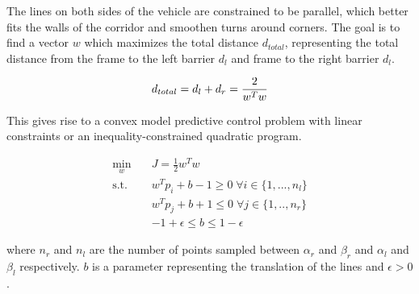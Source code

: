 \documentclass[conference]{IEEEtran}
\begin{document}
The lines on both sides of the vehicle are constrained to be parallel, which better fits the walls of the corridor and smoothen turns around corners. The goal is to find a vector $w$ which maximizes the total distance $d_{total}$, representing the total distance from the frame to the left barrier $d_l$ and frame to the right barrier $d_l$. 

\begin{align}
    d_{total} = d_l + d_r = \frac{2}{w^T w} \notag
\end{align}


This gives rise to a convex model predictive control problem with linear constraints or an inequality-constrained quadratic program.  

\begin{equation}
\begin{aligned}
        \min_{w}  \quad & J = \frac{1}{2}w^T w \\
        \text{s.t.} \quad & w^Tp_i + b - 1 \geq 0  \; \forall i \in \{1,...,n_l\} \\
        & w^Tp_j + b + 1 \leq 0 \; \forall j \in \{1,..,n_r\}\\ 
        & -1+\epsilon \leq b \leq 1 - \epsilon
\end{aligned}
\end{equation}


where $n_r$ and $n_l$ are the number of points sampled between $\alpha_r$ and $\beta_r$ and $\alpha_l$ and $\beta_l$ respectively. $b$ is a parameter representing the translation of the lines and $\epsilon > 0$.



\end{document}
